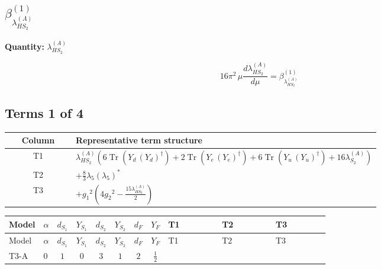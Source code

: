\documentclass[8pt]{article}
\begin{document}
\begin{landscape}
\section*{$\beta_{\lambda_{HS_2}^{(A)}}^{(1)}$}
\noindent\textbf{Quantity: }$\lambda_{HS_2}^{(A)}$\par\smallskip
\[16\pi^2\,\mu\frac{d \lambda_{HS_2}^{(A)}}{d\mu}=\beta_{\lambda_{HS_2}^{(A)}}^{(1)}\]
\subsection*{Terms 1 of 4}
\begin{center}
\begin{tabular}{@{}c >{\raggedright\arraybackslash}p{0.82\linewidth}@{}}
\toprule
Column & Representative term structure \\
\midrule
T1 & \(\displaystyle {\lambda_{HS_2}^{(A)}} (6 \operatorname{Tr}\!\left({Y_d}\,\left({Y_d}\right)^{\dagger}\right)+2 \operatorname{Tr}\!\left({Y_e}\,\left({Y_e}\right)^{\dagger}\right)+6 \operatorname{Tr}\!\left({Y_u}\,\left({Y_u}\right)^{\dagger}\right)+16 {\lambda_{S_2}^{(A)}})\) \\
\midrule
T2 & \(\displaystyle +\frac{8}{3} {\lambda_5} \left({\lambda_5}\right)^{*}\) \\
\midrule
T3 & \(\displaystyle +{g_1}^2 \left(4 {g_2}^2-\frac{15 {\lambda_{HS_2}^{(A)}}}{2}\right)\) \\
\midrule
\bottomrule
\end{tabular}
\end{center}
\smallskip
\tiny
\begin{longtable}{@{}llcccccc >{\raggedright\arraybackslash}p{0.21\linewidth} >{\raggedright\arraybackslash}p{0.21\linewidth} >{\raggedright\arraybackslash}p{0.21\linewidth}@{}}
\toprule
Model & $\alpha$ & $d_{S_1}$ & $Y_{S_1}$ & $d_{S_2}$ & $Y_{S_2}$ & $d_F$ & $Y_F$ & T1 & T2 & T3 \\
\midrule
\endfirsthead
\toprule
Model & $\alpha$ & $d_{S_1}$ & $Y_{S_1}$ & $d_{S_2}$ & $Y_{S_2}$ & $d_F$ & $Y_F$ & T1 & T2 & T3 \\
\midrule
\endhead
T3-A & $0$ & $1$ & $0$ & $3$ & $1$ & $2$ & $\frac{1}{2}$ & \scriptsize\adjustbox{max width=\linewidth}{$\begin{gathered} {\lambda_{HS_2}^{(A)}} (6 \operatorname{Tr}\!\left({Y_d}\,\left({Y_d}\right)^{\dagger}\right)+2 \operatorname{Tr}\!\left({Y_e}\,\left({Y_e}\right)^{\dagger}\right)+6 \operatorname{Tr}\!\left({Y_u}\,\left({Y_u}\right)^{\dagger}\right)+16 {\lambda_{S_2}^{(A)}})\end{gathered}$} & \scriptsize\adjustbox{max width=\linewidth}{$\begin{gathered} +\frac{8}{3} {\lambda_5} \left({\lambda_5}\right)^{*}\end{gathered}$} & \scriptsize\adjustbox{max width=\linewidth}{$\begin{gathered} +{g_1}^2 \left(4 {g_2}^2-\frac{15 {\lambda_{HS_2}^{(A)}}}{2}\right)\end{gathered}$} \\

\end{longtable}
\end{landscape}
\end{document}
